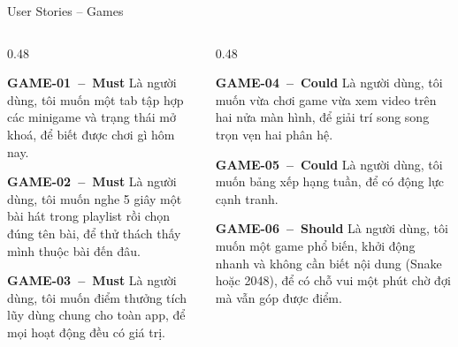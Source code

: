 \documentclass[aspectratio=169]{beamer}
\begin{document}
\begin{frame}{User Stories -- Games}
  \begin{columns}
    \begin{column}{0.48\textwidth}
      \begin{block}{\scriptsize\bfseries GAME-01~--~Must}
        {\tiny Là người dùng, tôi muốn một tab tập hợp các minigame và trạng thái mở khoá, để biết được chơi gì hôm nay.}
      \end{block}
      \begin{block}{\scriptsize\bfseries GAME-02~--~Must}
        {\tiny Là người dùng, tôi muốn nghe 5 giây một bài hát trong playlist rồi chọn đúng tên bài, để thử thách thấy mình thuộc bài đến đâu.}
      \end{block}
      \begin{block}{\scriptsize\bfseries GAME-03~--~Must}
        {\tiny Là người dùng, tôi muốn điểm thưởng tích lũy dùng chung cho toàn app, để mọi hoạt động đều có giá trị.}
      \end{block}
    \end{column}
    \begin{column}{0.48\textwidth}
      \begin{block}{\scriptsize\bfseries GAME-04~--~Could}
        {\tiny Là người dùng, tôi muốn vừa chơi game vừa xem video trên hai nửa màn hình, để giải trí song song trọn vẹn hai phân hệ.}
      \end{block}
      \begin{block}{\scriptsize\bfseries GAME-05~--~Could}
        {\tiny Là người dùng, tôi muốn bảng xếp hạng tuần, để có động lực cạnh tranh.}
      \end{block}
      \begin{block}{\scriptsize\bfseries GAME-06~--~Should}
        {\tiny Là người dùng, tôi muốn một game phổ biến, khởi động nhanh và không cần biết nội dung (Snake hoặc 2048), để có chỗ vui một phút chờ đợi mà vẫn góp được điểm.}
      \end{block}
    \end{column}
  \end{columns}
\end{frame}
\end{document}
